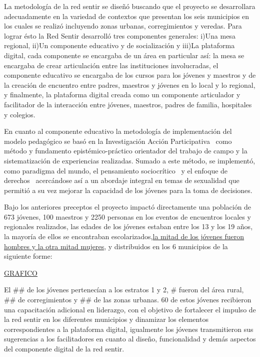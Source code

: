 \documentclass[journal,transmag]{IEEEtran}
\begin{document}
La metodología de la red sentir se diseñó buscando que el proyecto se desarrollara adecuadamente en la variedad de contextos que presentan los seis municipios en los cuales se realizó incluyendo zonas urbanas, corregimientos y veredas. Para lograr ésto la Red Sentir desarrolló tres componentes generales: i)Una mesa regional, ii)Un componente educativo y de socialización y iii)La plataforma digital, cada componente se encargaba de un área en particular así: la mesa se encargaba de crear articulación entre las instituciones  involucradas, el componente educativo se encargaba de los cursos para los jóvenes y maestros y de la creación de encuentro entre padres, maestros y jóvenes en lo local y lo regional, y finalmente, la plataforma digital creada como un componente articulador y facilitador de la interacción entre jóvenes, maestros, padres de familia, hospitales y colegios.

En cuanto al componente educativo la metodología de implementación del modelo pedagógico  se basó en la Investigación Acción Participativa~\cite{fals2008socialismo} como método y fundamento epistémico-práctico orientador del trabajo de campo y la sistematización de experiencias realizadas. Sumado a este método, se implementó, como paradigma del mundo, el pensamiento sociocrítico~\cite{stanley1991postmodern} y el enfoque de derechos~\cite{unesco} acercándose así a un abordaje integral en temas de sexualidad que permitió a su vez mejorar la capacidad de los jóvenes para la toma de decisiones.


Bajo los anteriores preceptos el proyecto impactó directamente una población de 673 jóvenes, 100 maestros y 2250 personas en los eventos de encuentros locales y regionales realizados, las edades de los jóvenes estaban entre los 13 y los 19 años, la mayoría de ellos se encontraban escolarizados,\underline{la mitad de los jóvenes fueron hombres y la otra mitad mujeres}, y distribuidos en los 6 municipios de la siguiente forme: 

\underline{GRAFICO}

El ## de los jóvenes pertenecían a los estratos 1 y 2, # fueron del área rural, ## de corregimientos y ## de las zonas urbanas. 60 de estos jóvenes recibieron una capacitación adicional en liderazgo, con el objetivo de fortalecer el impulso de la red sentir en los diferentes municipios y dinamizar los elementos correspondientes a la plataforma digital, igualmente los jóvenes transmitieron sus sugerencias a los facilitadores en cuanto al diseño, funcionalidad y demás aspectos del componente digital de la red sentir.
\end{document}
